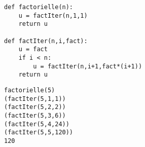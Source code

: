 \noindent\mbox{}\hspace*{1cm}\begin{py}{6cm}
\begin{verbatim}
def factorielle(n):
    u = factIter(n,1,1)
    return u

def factIter(n,i,fact):
    u = fact
    if i < n:
        u = factIter(n,i+1,fact*(i+1))
    return u
\end{verbatim}
\end{py}
\hfill
\begin{py}{6cm}
\begin{verbatim}
factorielle(5)
(factIter(5,1,1))
(factIter(5,2,2))
(factIter(5,3,6))
(factIter(5,4,24))
(factIter(5,5,120))
120
\end{verbatim}
\end{py}
\hspace*{1cm}\mbox{}\vspace*{2mm}


